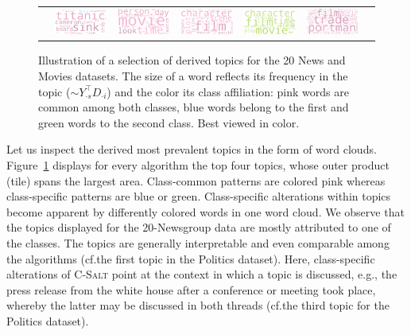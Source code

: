 \begin{figure}[!t]
\begin{tabular}{ccc@{\hskip 0.1in}cc@{\hskip 0.1in}cc}
    & \includegraphics[width=0.14\columnwidth]{pics/Wordclouds/MoviePunk_3}
    &  \includegraphics[width=0.14\columnwidth]{pics/Wordclouds/MoviePrimp_3}
    & \includegraphics[width=0.14\columnwidth]{pics/Wordclouds/MoviePrimp_4}
    &  \includegraphics[width=0.14\columnwidth]{pics/Wordclouds/MovieDBSSL_3}
    &  \includegraphics[width=0.14\columnwidth]{pics/Wordclouds/MovieDBSSL_4}
  \end{tabular}
  \caption{Illustration of a selection of derived topics for the 20 News and Movies datasets. The size of a word reflects its frequency in the topic ($\sim Y_{\cdot s}^\top D_{\cdot i}$) and the color its class affiliation: pink words are common among both classes, blue words belong to the first and green words to the second class. Best viewed in color.\label{fig:CS:topics}}
\end{figure}
Let us inspect the derived most prevalent topics in the form of word clouds.
Figure~\ref{fig:CS:topics} displays for every algorithm the top four topics, whose outer product (tile) spans the largest area. Class-common patterns are colored pink whereas class-specific patterns are blue or green. Class-specific alterations within topics become apparent by differently colored words in one word cloud. We observe that the topics displayed for the 20-Newsgroup data are mostly attributed to one of the classes. The topics are generally interpretable and even comparable among the algorithms (cf.\@ the first topic in the Politics dataset). Here, class-specific alterations of \textsc{C-Salt} point at the context in which a topic is discussed, e.g., the press release from the white house after a conference or meeting took place, whereby the latter may be discussed in both threads (cf.\@ the third topic for the Politics dataset).

